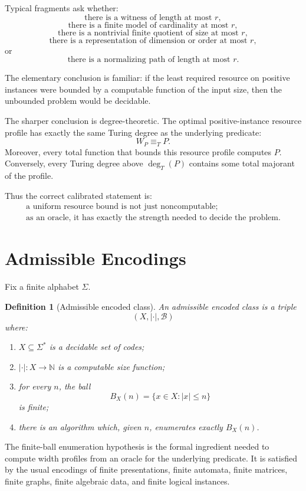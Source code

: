 \documentclass[11pt]{article}
\newtheorem{definition}[theorem]{Definition}
\begin{document}
Typical fragments ask whether:
\[
\text{there is a witness of length at most }r,
\]
\[
\text{there is a finite model of cardinality at most }r,
\]
\[
\text{there is a nontrivial finite quotient of size at most }r,
\]
\[
\text{there is a representation of dimension or order at most }r,
\]
or
\[
\text{there is a normalizing path of length at most }r.
\]

The elementary conclusion is familiar: if the least required resource on positive instances were bounded by a computable function of the input size, then the unbounded problem would be decidable.

The sharper conclusion is degree-theoretic. The optimal positive-instance resource profile has exactly the same Turing degree as the underlying predicate:
\[
W_P\equiv_T P.
\]
Moreover, every total function that bounds this resource profile computes \(P\). Conversely, every Turing degree above \(\deg_T(P)\) contains some total majorant of the profile.

Thus the correct calibrated statement is:
\[
\begin{gathered}
\text{a uniform resource bound is not just noncomputable;}\\
\text{as an oracle, it has exactly the strength needed to decide the problem.}
\end{gathered}
\]

\section{Admissible Encodings}

Fix a finite alphabet \(\Sigma\).

\begin{definition}[Admissible encoded class]
An admissible encoded class is a triple
\[
(X,|\cdot|,\mathcal B)
\]
where:
\begin{enumerate}[label=(\roman*)]
\item \(X\subseteq\Sigma^\ast\) is a decidable set of codes;
\item \(|\cdot|:X\to\mathbb N\) is a computable size function;
\item for every \(n\), the ball
\[
B_X(n)=\{x\in X:|x|\le n\}
\]
is finite;
\item there is an algorithm which, given \(n\), enumerates exactly \(B_X(n)\).
\end{enumerate}
\end{definition}

The finite-ball enumeration hypothesis is the formal ingredient needed to compute width profiles from an oracle for the underlying predicate. It is satisfied by the usual encodings of finite presentations, finite automata, finite matrices, finite graphs, finite algebraic data, and finite logical instances.
\end{document}
